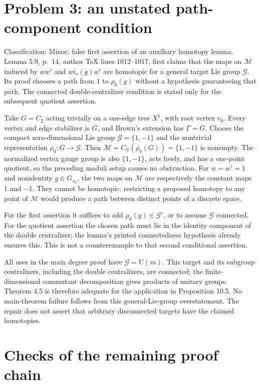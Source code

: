 \documentclass[10pt]{article}
\begin{document}
\section*{Problem 3: an unstated path-component condition}
Classification: Minor; false first assertion of an auxiliary homotopy lemma. Lemma 5.9, p. 14, author TeX lines 1012–1017, first claims that the maps on \(\mathcal M\) induced by \(ww'\) and \(w i_v(g)w'\) are homotopic for a general target Lie group \(\mathcal G\). Its proof chooses a path from \(1\) to \(\rho_0(g)\) without a hypothesis guaranteeing that path. The connected double-centralizer condition is stated only for the subsequent quotient assertion.\par
Take \(G=C_2\) acting trivially on a one-edge tree \(X^1\), with root vertex \(v_0\). Every vertex and edge stabilizer is \(G\), and Brown’s extension has \(\Gamma=G\). Choose the compact zero-dimensional Lie group \(\mathcal G=\{1,-1\}\) and the nontrivial representation \(\rho_0:G\to\mathcal G\). Then \(\mathcal M=C_{\mathcal G}(\rho_0(G))=\{1,-1\}\) is nonempty. The normalized vertex gauge group is also \(\{1,-1\}\), acts freely, and has a one-point quotient, so the preceding moduli setup causes no obstruction. For \(w=w'=1\) and nonidentity \(g\in G_{v_0}\), the two maps on \(\mathcal M\) are respectively the constant maps \(1\) and \(-1\). They cannot be homotopic: restricting a proposed homotopy to any point of \(\mathcal M\) would produce a path between distinct points of a discrete space.\par
For the first assertion it suffices to add \(\rho_0(g)\in\mathcal G^\circ\), or to assume \(\mathcal G\) connected. For the quotient assertion the chosen path must lie in the identity component of the double centralizer; the lemma’s printed connectedness hypothesis already ensures this. This is not a counterexample to that second conditional assertion.\par
All uses in the main degree proof have \(\mathcal G=\mathrm U(m)\). This target and its subgroup centralizers, including the double centralizers, are connected; the finite-dimensional commutant decomposition gives products of unitary groups. Theorem 4.5 is therefore adequate for the application in Proposition 10.5. No main-theorem failure follows from this general-Lie-group overstatement. The repair does not assert that arbitrary disconnected targets have the claimed homotopies.\par
\section*{Checks of the remaining proof chain}
\end{document}
